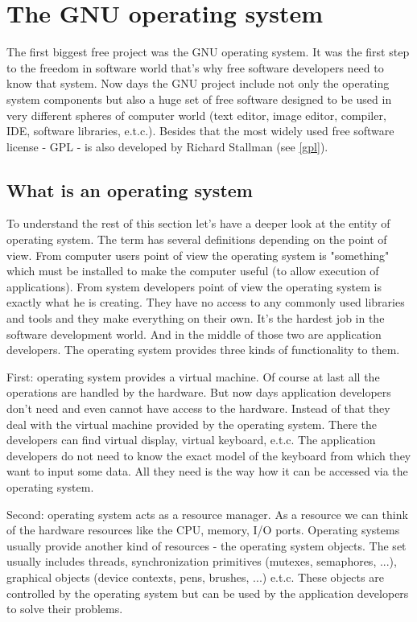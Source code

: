 \section{The GNU operating system}
\label{gnu}

The first biggest free project was the GNU operating system. It was the first step to the freedom in software world that's why free software developers need to know that system. Now days the GNU project include not only the operating system components but also a huge set of free software designed to be used in very different spheres of computer world (text editor, image editor, compiler, IDE, software libraries, e.t.c.). Besides that the most widely used free software license - GPL - is also developed by Richard Stallman (see \ref{gpl}).

\subsection{What is an operating system}
\label{os}

To understand the rest of this section let's have a deeper look at the entity of operating system. The term has several definitions depending on the point of view. From computer users point of view the operating system is "something" which must be installed to make the computer useful (to allow execution of applications). From system developers point of view the operating system is exactly what he is creating. They have no access to any commonly used libraries and tools and they make everything on their own. It's the hardest job in the software development world. And in the middle of those two are application developers. The operating system provides three kinds of functionality to them.

First: operating system provides a virtual machine. Of course at last all the operations are handled by the hardware. But now days application developers don't need and even cannot have access to the hardware. Instead of that they deal with the virtual machine provided by the operating system. There the developers can find virtual display, virtual keyboard, e.t.c. The application developers do not need to know the exact model of the keyboard from which they want to input some data. All they need is the way how it can be accessed via the operating system.

Second: operating system acts as a resource manager. As a resource we can think of the hardware resources like the CPU, memory, I/O ports. Operating systems usually provide another kind of resources - the operating system objects. The set usually includes threads, synchronization primitives (mutexes, semaphores, ...), graphical objects (device contexts, pens, brushes, ...) e.t.c. These objects are controlled by the operating system but can be used by the application developers to solve their problems.

